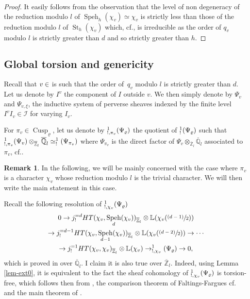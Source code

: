 \documentclass[11pt]{article}
\newcommand{\cf}{cf.\xspace}
\newcommand{\NoChangel}[1]{%
\expandafter\let\csname old\string#1\endcsname=#1
\let#1=\relax
\newcommand{#1}{\mathcode`l="716C\csname old\string#1\endcsname\mathcode`l="7160 }%
}
\newcommand{\psfrac}[2]{\sfrac{(#1)}{#2}}
\theoremstyle{plain}
\theoremstyle{definition}
\newtheorem*{remark}{Remark}
\numberwithin{equation}{subsection}
\newcommand\Qm{{\mathbb Q}}
\newcommand\Zm{{\mathbb Z}}
\newcommand\Lm{{\mathbb L}}
\newcommand\IC{{\mathcal I}}
\DeclareMathOperator{\cusp}{Cusp}
\DeclareMathOperator{\speh}{Speh}
\DeclareMathOperator{\st}{St}
\DeclareMathOperator{\spl}{Spl}\NoChangel{\spl}
\DeclareMathOperator{\Fil}{Fil}\NoChangel{\Fil}
\begin{document}
\begin{proof}
It easily follows from the observation that the level of non degeneracy of
the reduction modulo $l$ of $\speh_h(\chi_v) \simeq \chi_v$ is strictly less than
those of the reduction modulo $l$ of $\st_h(\chi_v)$ which, \cf \cite{boyer-repmodl},
is irreducible as the order
of $q_v$ modulo $l$ is strictly greater than $d$ and so strictly greater than $h$.
\end{proof}

\subsection{Global torsion and genericity}
\label{para-generic}

Recall that $v \in \spl$ is such that the order of~$q_v$ modulo $l$ is strictly
greater than $d$. Let us denote by $I^{v}$ the component of $I$ outside $v$.
We then simply denote by $\Psi_v$ and $\Psi_{v,\xi}$,
the inductive system of perverse sheaves indexed by the finite level $I^{v} I_v \in \IC$
for varying $I_v$.

For $\pi_{v} \in \cusp_\varrho$, let us denote by $\Fil^1_{!,\pi_{v}}(\Psi_\varrho)$ the quotient of $\Fil^1_!(\Psi_\varrho)$ such that
$\Fil^1_{!,\pi_{v}}(\Psi_v) \otimes_{\overline \Zm_l} \overline \Qm_l \simeq \Fil^1_!(\Psi_{\pi_{v}})$
where $\Psi_{\pi_{v}}$ is the direct factor of $\Psi_v \otimes_{\overline \Zm_l} \overline \Qm_l$
associated to $\pi_{v}$, \cf \cite{boyer-torsion}.

\begin{remark}
In the following, we will be mainly concerned with the case where $\pi_v$
is a character $\chi_v$ whose reduction modulo $l$ is the trivial character.
We will then write the main statement in this case.
\end{remark}

Recall the following resolution of $\Fil^1_{!,\chi_{v}}(\Psi_\varrho)$
\begin{multline} \label{eq-resolution-psi0}
0 \to j^{=d}_! HT(\chi_{v},\speh_d(\chi_{v}))_{\overline \Zm_l} \otimes \Lm (\chi_{v}(\psfrac{d-1}{2}))\\
\to j^{=d-1}_!HT(\chi_{v},\speh_{d-1}(\chi_{v}))_{\overline \Zm_l} \otimes \Lm (\chi_{v}(\psfrac{d-2}{2}))
\to \cdots \\ \to j^{=1}_! HT(\chi_{v},\chi_{v})_{\overline \Zm_l} \otimes \Lm(\chi_{v})
\to \Fil^1_{!,\chi_{v}}(\Psi_\varrho) \to 0,
\end{multline}
which is proved in \cite{boyer-torsion} over $\overline \Qm_l$. I claim it is
also true over $\overline \Zm_l$. Indeed, using Lemma \ref{lem-ext0},
it is equivalent to the fact the sheaf cohomology of $\Fil^1_{!,\chi_{v}}(\Psi_\varrho)$
is torsion-free, which follows then from \cite{s-s}, the comparison
theorem of Faltings-Fargues \cf \cite{fargues-faltings} and the main theorem
of \cite{fargues-monodromie}.
\end{document}
